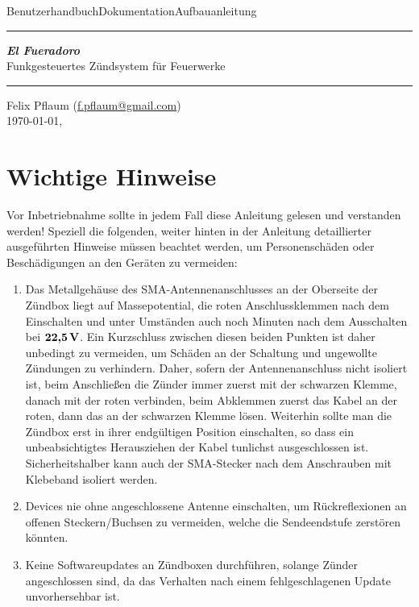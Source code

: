 \documentclass[pdftex, parskip, numbers=noenddot, toc=listof]{scrbook}
\newcommand{\anlage}{\emph{El Fueradoro}}
\begin{document}
	\begin{titlepage}
		\thispagestyle{empty}
		{\sffamily\LARGE Benutzerhandbuch{\hfill}Dokumentation{\hfill}Aufbauanleitung}\\ \hrule \vspace*{\fill}
		\begin{center}
			{\fontsize{90pt}{90pt} \sffamily\textbf{\anlage}} \\ \vspace{2em}
			{\LARGE \sffamily Funkgesteuertes Zündsystem für Feuerwerke}
		\end{center}
		\vspace*{\fill}
		\hrule
		\begin{center}
			\sffamily\Large Felix Pflaum (\href{mailto:f.pflaum@gmail.com}{f.pflaum@gmail.com})\\
			\normalsize \ddmmyyyydate\today, \currenttime
		\end{center}
	\end{titlepage}
	\chapter*{Wichtige Hinweise}

	Vor Inbetriebnahme sollte in jedem Fall diese Anleitung gelesen und verstanden werden! Speziell die folgenden, weiter hinten in der Anleitung detaillierter ausgeführten Hinweise müssen beachtet werden, um Personenschäden oder Beschädigungen an den Geräten zu vermeiden:

	{\bfseries \begin{enumerate}
		\item Das Metallgehäuse des SMA-Antennenanschlusses an der Oberseite der Zündbox liegt auf Massepotential, die roten Anschlussklemmen nach dem Einschalten und unter Umständen auch noch Minuten nach dem Ausschalten bei $\unit[\textbf{22{,}5}]{\textbf{V}}$. Ein Kurzschluss zwischen diesen beiden Punkten ist daher unbedingt zu vermeiden, um Schäden an der Schaltung und ungewollte Zündungen zu verhindern. Daher, sofern der Antennenanschluss nicht isoliert ist, beim Anschließen die Zünder immer zuerst mit der schwarzen Klemme, danach mit der roten verbinden, beim Abklemmen zuerst das Kabel an der roten, dann das an der schwarzen Klemme lösen. Weiterhin sollte man die Zündbox erst in ihrer endgültigen Position einschalten, so dass ein unbeabsichtigtes Herausziehen der Kabel tunlichst ausgeschlossen ist. Sicherheitshalber kann auch der SMA-Stecker nach dem Anschrauben mit Klebeband isoliert werden.
		\item Devices nie ohne angeschlossene Antenne einschalten, um Rückreflexionen an offenen Steckern/Buchsen zu vermeiden, welche die Sendeendstufe zerstören könnten.
		\item Keine Softwareupdates an Zündboxen durchführen, solange Zünder angeschlossen sind, da das Verhalten nach einem fehlgeschlagenen Update unvorhersehbar ist.
		\end{enumerate}}
\end{document}
